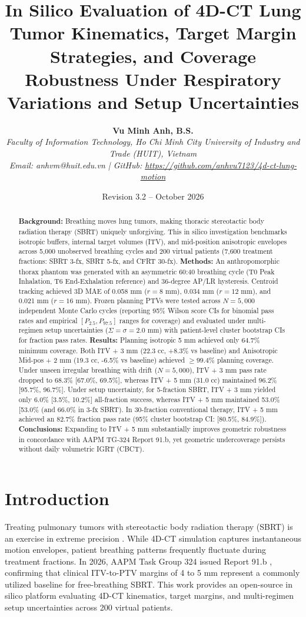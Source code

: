\documentclass[10pt,twocolumn]{article}
\title{\textbf{In Silico Evaluation of 4D-CT Lung Tumor Kinematics, Target Margin Strategies, and Coverage Robustness Under Respiratory Variations and Setup Uncertainties}}
\author{\textbf{Vu Minh Anh, B.S.}\\
\textit{Faculty of Information Technology, Ho Chi Minh City University of Industry and Trade (HUIT), Vietnam}\\
\textit{Email: anhvm@huit.edu.vn | GitHub: \url{https://github.com/anhvu7123/4d-ct-lung-motion}}}
\date{Revision 3.2 -- October 2026}
\begin{document}
\maketitle

\begin{abstract}
\textbf{Background:} Breathing moves lung tumors, making thoracic stereotactic body radiation therapy (SBRT) uniquely unforgiving. This in silico investigation benchmarks isotropic buffers, internal target volumes (ITV), and mid-position anisotropic envelopes across 5,000 unobserved breathing cycles and 200 virtual patients (7,600 treatment fractions: SBRT 3-fx, SBRT 5-fx, and CFRT 30-fx).
\textbf{Methods:} An anthropomorphic thorax phantom was generated with an asymmetric 60:40 breathing cycle (T0 Peak Inhalation, T6 End-Exhalation reference) and 36-degree AP/LR hysteresis. Centroid tracking achieved 3D MAE of 0.058 mm ($r=8$ mm), 0.034 mm ($r=12$ mm), and 0.021 mm ($r=16$ mm). Frozen planning PTVs were tested across $N=5,000$ independent Monte Carlo cycles (reporting 95\% Wilson score CIs for binomial pass rates and empirical $[P_{2.5}, P_{97.5}]$ ranges for coverage) and evaluated under multi-regimen setup uncertainties ($\Sigma = \sigma = 2.0$ mm) with patient-level cluster bootstrap CIs for fraction pass rates.
\textbf{Results:} Planning isotropic 5 mm achieved only 64.7\% minimum coverage. Both ITV + 3 mm (22.3 cc, +8.3\% vs baseline) and Anisotropic Mid-pos + 2 mm (19.3 cc, -6.5\% vs baseline) achieved $\ge 99.4\%$ planning coverage. Under unseen irregular breathing with drift ($N=5,000$), ITV + 3 mm pass rate dropped to 68.3\% [67.0\%, 69.5\%], whereas ITV + 5 mm (31.0 cc) maintained 96.2\% [95.7\%, 96.7\%]. Under setup uncertainty, for 5-fraction SBRT, ITV + 3 mm yielded only 6.0\% [3.5\%, 10.2\%] all-fraction success, whereas ITV + 5 mm maintained 53.0\% [53.0\% (and 66.0\% in 3-fx SBRT). In 30-fraction conventional therapy, ITV + 5 mm achieved an 82.7\% fraction pass rate (95\% cluster bootstrap CI: [80.5\%, 84.9\%]).
\textbf{Conclusions:} Expanding to ITV + 5 mm substantially improves geometric robustness in concordance with AAPM TG-324 Report 91.b, yet geometric undercoverage persists without daily volumetric IGRT (CBCT).
\end{abstract}

\section{Introduction}
Treating pulmonary tumors with stereotactic body radiation therapy (SBRT) is an exercise in extreme precision \cite{keall2006}. While 4D-CT simulation captures instantaneous motion envelopes, patient breathing patterns frequently fluctuate during treatment fractions. In 2026, AAPM Task Group 324 issued Report 91.b \cite{tg324}, confirming that clinical ITV-to-PTV margins of 4 to 5 mm represent a commonly utilized baseline for free-breathing SBRT. This work provides an open-source in silico platform evaluating 4D-CT kinematics, target margins, and multi-regimen setup uncertainties across 200 virtual patients.
\end{document}

